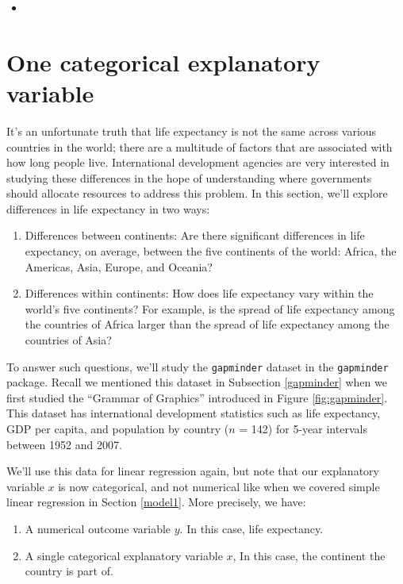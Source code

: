 \documentclass[12pt,]{krantz}
\providecommand{\tightlist}{%
  \setlength{\itemsep}{0pt}\setlength{\parskip}{0pt}}
\newenvironment{rmdblock}[1]
  {\begin{shaded*}
  \begin{itemize}
  \renewcommand{\labelitemi}{
    \raisebox{-.7\height}[0pt][0pt]{
    }
  }
  \item
  }
  {
  \end{itemize}
  \end{shaded*}
  }
\newenvironment{learncheck}
  {\begin{rmdblock}{warning}}
  {\end{rmdblock}}
\theoremstyle{definition}
\theoremstyle{definition}
\theoremstyle{definition}
\theoremstyle{remark}
\begin{document}
\begin{learncheck}

\end{learncheck}

\section{One categorical explanatory variable}\label{model2}

It's an unfortunate truth that life expectancy is not the same across
various countries in the world; there are a multitude of factors that
are associated with how long people live. International development
agencies are very interested in studying these differences in the hope
of understanding where governments should allocate resources to address
this problem. In this section, we'll explore differences in life
expectancy in two ways:

\begin{enumerate}
\def\labelenumi{\arabic{enumi}.}
\tightlist
\item
  Differences between continents: Are there significant differences in
  life expectancy, on average, between the five continents of the world:
  Africa, the Americas, Asia, Europe, and Oceania?
\item
  Differences within continents: How does life expectancy vary within
  the world's five continents? For example, is the spread of life
  expectancy among the countries of Africa larger than the spread of
  life expectancy among the countries of Asia?
\end{enumerate}

To answer such questions, we'll study the \texttt{gapminder} dataset in
the \texttt{gapminder} package. Recall we mentioned this dataset in
Subsection \ref{gapminder} when we first studied the ``Grammar of
Graphics'' introduced in Figure \ref{fig:gapminder}. This dataset has
international development statistics such as life expectancy, GDP per
capita, and population by country (\(n\) = 142) for 5-year intervals
between 1952 and 2007.

We'll use this data for linear regression again, but note that our
explanatory variable \(x\) is now categorical, and not numerical like
when we covered simple linear regression in Section \ref{model1}. More
precisely, we have:

\begin{enumerate}
\def\labelenumi{\arabic{enumi}.}
\tightlist
\item
  A numerical outcome variable \(y\). In this case, life expectancy.
\item
  A single categorical explanatory variable \(x\), In this case, the
  continent the country is part of.
\end{enumerate}
\end{document}
